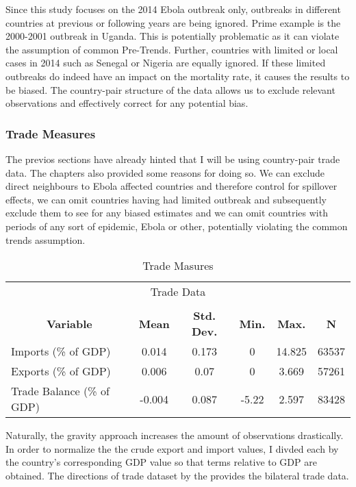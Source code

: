 \documentclass{article}
\begin{document}
Since this study focuses on the 2014 Ebola outbreak only, outbreaks in different countries at previous or following years are being ignored. Prime example is the 2000-2001 outbreak in Uganda. This is potentially problematic as it can violate the assumption of common Pre-Trends. Further, countries with limited or local cases in 2014 such as Senegal or Nigeria are equally ignored. If these limited outbreaks do indeed have an impact on the mortality rate, it causes the results to be biased. The country-pair structure of the data allows us to exclude relevant observations and effectively correct for any potential bias.

\subsubsection{Trade Measures}

The previos sections have already hinted that I will be using country-pair trade data. The chapters also provided some reasons for doing so. We can exclude direct neighbours to Ebola affected countries and therefore control for spillover effects, we can omit countries having had limited outbreak and subsequently exclude them to see for any biased estimates and we can omit countries with periods of any sort of epidemic, Ebola or other, potentially violating the common trends assumption. \\

\begin{table}[htbp]\centering \caption{Trade Masures \label{Trade Measures}}
\begin{tabular}{l c c c c c}\hline\hline
\multicolumn{6}{c}{Trade Data}\\ \\ \hline
\multicolumn{1}{c}{\textbf{Variable}} & \textbf{Mean}
 & \textbf{Std. Dev.}& \textbf{Min.} &  \textbf{Max.} & \textbf{N}\\ \hline
Imports (\% of GDP) & 0.014 & 0.173 & 0 & 14.825 & 63537\\
Exports (\% of GDP) & 0.006 & 0.07 & 0 & 3.669 & 57261\\
Trade Balance (\% of GDP) & -0.004 & 0.087 & -5.22 & 2.597 & 83428\\
\hline\end{tabular}
\end{table}
Naturally, the gravity approach increases the amount of observations drastically. In order to normalize the the crude export and import values, I divded each by the country's corresponding GDP value so that terms relative to GDP are obtained. The directions of trade dataset by the \cite{imfdot} provides the bilateral trade data. 
\end{document}
